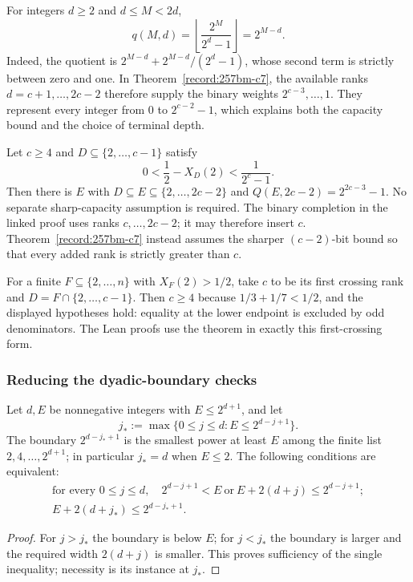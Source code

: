\begin{prop}\label{record:257bm-c9}
For integers $d\ge2$ and $d\le M<2d$,
\[
 q(M,d)=\left\lfloor\frac{2^M}{2^d-1}\right\rfloor=2^{M-d}.
\]
Indeed, the quotient is $2^{M-d}+2^{M-d}/(2^d-1)$, whose second
term is strictly between zero and one.  In
Theorem~\ref{record:257bm-c7}, the available ranks
$d=c+1,\ldots,2c-2$ therefore supply the binary weights
$2^{c-3},\ldots,1$.  They represent every integer from $0$ to
$2^{c-2}-1$, which explains both the capacity bound and the
choice of terminal depth.
\end{prop}

\begin{thm}\label{record:257bm-c10}
Let $c\ge4$ and $D\subseteq\{2,\ldots,c-1\}$ satisfy
\[
 0<\frac12-X_D(2)<\frac1{2^c-1}.
\]
Then there is $E$ with $D\subseteq E\subseteq\{2,\ldots,2c-2\}$ and
$Q(E,2c-2)=2^{2c-3}-1$.  No separate sharp-capacity assumption is
required.  The binary completion in the linked proof uses ranks
$c,\ldots,2c-2$; it may therefore insert $c$.
Theorem~\ref{record:257bm-c7} instead assumes the sharper
$(c-2)$-bit bound so that every added rank is strictly greater than $c$.
\end{thm}

For a finite $F\subseteq\{2,\ldots,n\}$ with $X_F(2)>1/2$, take
$c$ to be its first crossing rank and $D=F\cap\{2,\ldots,c-1\}$.
Then $c\ge4$ because $1/3+1/7<1/2$, and the displayed hypotheses
hold: equality at the lower endpoint is excluded by odd denominators.
The Lean proofs use the theorem in exactly this first-crossing form.

\subsubsection*{Reducing the dyadic-boundary checks}

\begin{thm}\label{record:257bm-c11}
Let $d,E$ be nonnegative integers with $E\le2^{d+1}$, and let
\[
 j_*:=\max\{0\le j\le d:E\le2^{d-j+1}\}.
\]
The boundary $2^{d-j_*+1}$ is the smallest power at least $E$ among
the finite list $2,4,\ldots,2^{d+1}$; in particular $j_*=d$ when $E\le2$.
The following conditions are equivalent:
\[
 \begin{gathered}
 \text{for every }0\le j\le d,\quad
 2^{d-j+1}<E\ \text{or}\ E+2(d+j)\le2^{d-j+1};\\
 E+2(d+j_*)\le2^{d-j_*+1}.
 \end{gathered}
\]
\end{thm}
\begin{proof}
For $j>j_*$ the boundary is below $E$; for $j<j_*$ the boundary
is larger and the required width $2(d+j)$ is smaller.  This proves
sufficiency of the single inequality; necessity is its instance
at $j_*$.
\end{proof}

